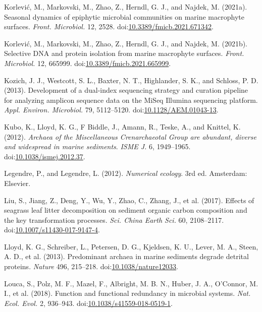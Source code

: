 \documentclass[12pt,]{article}
\begin{document}
\leavevmode\hypertarget{ref-Korlevic2021a}{}%
Korlević, M., Markovski, M., Zhao, Z., Herndl, G. J., and Najdek, M.
(2021a). Seasonal dynamics of epiphytic microbial communities on marine
macrophyte surfaces. \emph{Front. Microbiol.} 12, 2528.
doi:\href{https://doi.org/10.3389/fmicb.2021.671342}{10.3389/fmicb.2021.671342}.

\leavevmode\hypertarget{ref-Korlevic2021}{}%
Korlević, M., Markovski, M., Zhao, Z., Herndl, G. J., and Najdek, M.
(2021b). Selective DNA and protein isolation from marine macrophyte
surfaces. \emph{Front. Microbiol.} 12, 665999.
doi:\href{https://doi.org/10.3389/fmicb.2021.665999}{10.3389/fmicb.2021.665999}.

\leavevmode\hypertarget{ref-Kozich2013a}{}%
Kozich, J. J., Westcott, S. L., Baxter, N. T., Highlander, S. K., and
Schloss, P. D. (2013). Development of a dual-index sequencing strategy
and curation pipeline for analyzing amplicon sequence data on the MiSeq
Illumina sequencing platform. \emph{Appl. Environ. Microbiol.} 79,
5112--5120.
doi:\href{https://doi.org/10.1128/AEM.01043-13}{10.1128/AEM.01043-13}.

\leavevmode\hypertarget{ref-Kubo2012}{}%
Kubo, K., Lloyd, K. G., F Biddle, J., Amann, R., Teske, A., and Knittel,
K. (2012). \emph{Archaea \textup{of the Miscellaneous Crenarchaeotal
Group are abundant, diverse and widespread in marine sediments}}.
\emph{ISME J.} 6, 1949--1965.
doi:\href{https://doi.org/10.1038/ismej.2012.37}{10.1038/ismej.2012.37}.

\leavevmode\hypertarget{ref-Legendre2012}{}%
Legendre, P., and Legendre, L. (2012). \emph{Numerical ecology}. 3rd ed.
Amsterdam: Elsevier.

\leavevmode\hypertarget{ref-Liu2017}{}%
Liu, S., Jiang, Z., Deng, Y., Wu, Y., Zhao, C., Zhang, J., et al.
(2017). Effects of seagrass leaf litter decomposition on sediment
organic carbon composition and the key transformation processes.
\emph{Sci. China Earth Sci.} 60, 2108--2117.
doi:\href{https://doi.org/10.1007/s11430-017-9147-4}{10.1007/s11430-017-9147-4}.

\leavevmode\hypertarget{ref-Lloyd2013}{}%
Lloyd, K. G., Schreiber, L., Petersen, D. G., Kjeldsen, K. U., Lever, M.
A., Steen, A. D., et al. (2013). Predominant archaea in marine sediments
degrade detrital proteins. \emph{Nature} 496, 215--218.
doi:\href{https://doi.org/10.1038/nature12033}{10.1038/nature12033}.

\leavevmode\hypertarget{ref-Louca2018}{}%
Louca, S., Polz, M. F., Mazel, F., Albright, M. B. N., Huber, J. A.,
O'Connor, M. I., et al. (2018). Function and functional redundancy in
microbial systems. \emph{Nat. Ecol. Evol.} 2, 936--943.
doi:\href{https://doi.org/10.1038/s41559-018-0519-1}{10.1038/s41559-018-0519-1}.
\end{document}
